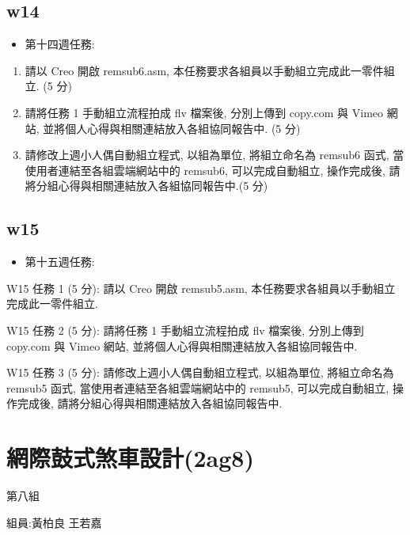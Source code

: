 \documentclass[]{article}
\begin{document}
\subsection{w14}\label{w14-1}

\begin{itemize}
\itemsep1pt\parskip0pt
\item
  第十四週任務:
\end{itemize}

\begin{enumerate}
\def\labelenumi{\arabic{enumi}.}
\item
  請以 Creo 開啟 remsub6.asm,
  本任務要求各組員以手動組立完成此一零件組立. (5 分)
\item
  請將任務 1 手動組立流程拍成 flv 檔案後, 分別上傳到 copy.com 與 Vimeo
  網站, 並將個人心得與相關連結放入各組協同報告中. (5 分)
\item
  請修改上週小人偶自動組立程式, 以組為單位, 將組立命名為 remsub6 函式,
  當使用者連結至各組雲端網站中的 remsub6, 可以完成自動組立, 操作完成後,
  請將分組心得與相關連結放入各組協同報告中.(5 分)
\end{enumerate}

\subsection{w15}\label{w15-1}

\begin{itemize}
\itemsep1pt\parskip0pt
\item
  第十五週任務:
\end{itemize}

W15 任務 1 (5 分): 請以 Creo 開啟 remsub5.asm,
本任務要求各組員以手動組立完成此一零件組立.

W15 任務 2 (5 分): 請將任務 1 手動組立流程拍成 flv 檔案後, 分別上傳到
copy.com 與 Vimeo 網站, 並將個人心得與相關連結放入各組協同報告中.

W15 任務 3 (5 分): 請修改上週小人偶自動組立程式, 以組為單位,
將組立命名為 remsub5 函式, 當使用者連結至各組雲端網站中的 remsub5,
可以完成自動組立, 操作完成後, 請將分組心得與相關連結放入各組協同報告中.

\section{網際鼓式煞車設計(2ag8)}\label{ux7db2ux969bux9f13ux5f0fux715eux8ecaux8a2dux8a082ag8}

第八組

組員:黃柏良 王若嘉
\end{document}
